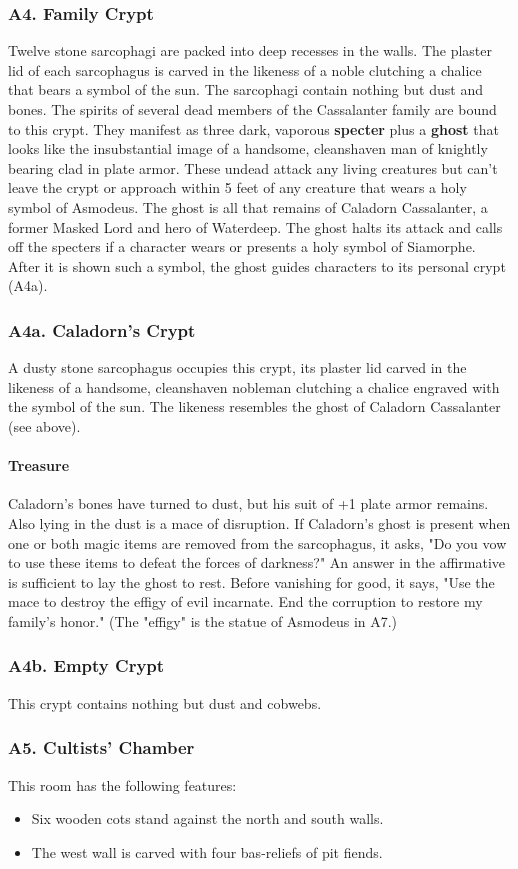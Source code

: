 \documentclass[10pt,a4paper,twoside,twocolumn,openany,nodeprecatedcode]{dndbook}
\begin{document}
\subsubsection{A4. Family Crypt}
Twelve stone sarcophagi are packed into deep recesses in the walls. The plaster lid of each sarcophagus is carved in the likeness of a noble clutching a chalice that bears a symbol of the sun. The sarcophagi contain nothing but dust and bones.
The spirits of several dead members of the Cassalanter family are bound to this crypt. They manifest as three dark, vaporous \textbf{specter} plus a \textbf{ghost} that looks like the insubstantial image of a handsome, cleanshaven man of knightly bearing clad in plate armor. These undead attack any living creatures but can't leave the crypt or approach within 5 feet of any creature that wears a holy symbol of Asmodeus.
The ghost is all that remains of Caladorn Cassalanter, a former Masked Lord and hero of Waterdeep. The ghost halts its attack and calls off the specters if a character wears or presents a holy symbol of Siamorphe. After it is shown such a symbol, the ghost guides characters to its personal crypt (A4a).
\subsubsection{A4a. Caladorn's Crypt}
A dusty stone sarcophagus occupies this crypt, its plaster lid carved in the likeness of a handsome, cleanshaven nobleman clutching a chalice engraved with the symbol of the sun. The likeness resembles the ghost of Caladorn Cassalanter (see above).
\paragraph{Treasure}
Caladorn's bones have turned to dust, but his suit of +1 plate armor remains. Also lying in the dust is a mace of disruption. If Caladorn's ghost is present when one or both magic items are removed from the sarcophagus, it asks, "Do you vow to use these items to defeat the forces of darkness?" An answer in the affirmative is sufficient to lay the ghost to rest. Before vanishing for good, it says, "Use the mace to destroy the effigy of evil incarnate. End the corruption to restore my family's honor." (The "effigy" is the statue of Asmodeus in A7.)
\subsubsection{A4b. Empty Crypt}
This crypt contains nothing but dust and cobwebs.
\subsubsection{A5. Cultists' Chamber}
This room has the following features:
\begin{itemize}

\item Six wooden cots stand against the north and south walls.
\item The west wall is carved with four bas-reliefs of pit fiends.
\end{itemize}
\end{document}

